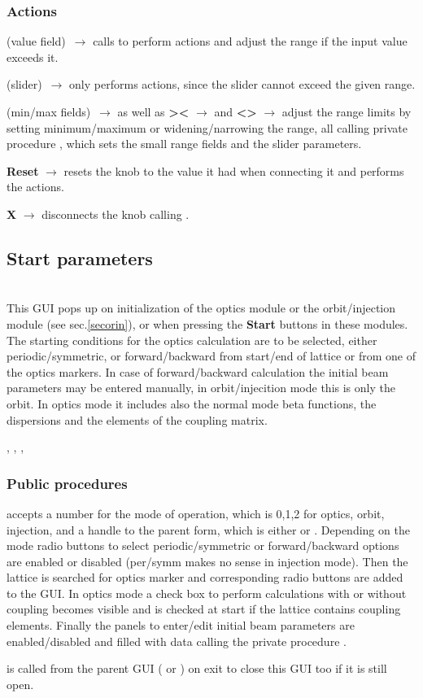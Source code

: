 \documentclass[12pt]{article}
\newcommand\code[1]{{\tt #1}}
\newcommand{\ofld}[1]{\colorbox{black!15}{{{\color{black}\bf #1}}}}
\newcommand{\ofldx}[1]{\colorbox{black!15}{{\color{black}(#1)}}}
\newcommand\guico[1]{{\color{blue}\code{#1}}}
\newcommand\guifco[1]{{\color{violet}\code{#1}}}
\newcommand{\evcodf}[2]{\ofld{#1} $\rightarrow$ \guifco{#2}}
\newcommand{\evcodxf}[2]{\ofldx{#1}~$\rightarrow$ \guifco{#2}}
\newcommand{\opagui}[1]{\colorbox{blue!20}{{\color{black}\code{#1}}}}
\newcommand{\oguih}[2]{\subsection{\label{#2}#1}{\Huge\opagui{#2}}\\}
\newcommand{\ogui}[1]{\hyperref[#1]{\opagui{#1}}}
\newcommand{\opauni}[1]{\colorbox{orange!30}{{\color{black}\code{#1}}}}
\newcommand{\ouni}[1]{\hyperref[#1]{\opauni{#1}}}
\newcommand{\uses}[1]{\flushleft {\bf Uses:} #1}
\newcommand{\desc}[1]{#1}
\newcommand{\act}[1]{\subsubsection*{Actions} #1}
\newcommand{\ppro}[1]{\subsubsection*{Public procedures} #1}
\begin{document}
\act{
\evcodxf{value field}{editKKeyPress} calls \guifco{KUpdate} to perform actions and adjust the range if the input value exceeds it.

\evcodxf{slider}{sliderScroll} only performs actions, since the slider cannot exceed the given range.

\evcodxf{min/max fields}{editmin/maxKeyPress} as well as \evcodf{\textgreater\textless}{butwidClick} and \evcodf{\textless\textgreater}{butnarClick} adjust the range limits by setting minimum/maximum or widening/narrowing the range, all calling private procedure \guifco{SetKrange}, which sets the small range fields and the slider parameters.

\evcodf{Reset}{butresClick} resets the knob to the value it had when connecting it and performs the actions.

\evcodf{X}{butfreeClick} disconnects the knob calling \guifco{Unload}.
}

\oguih{Start parameters}{ostartmenu} 

\desc{This GUI pops up on initialization of the optics module  \ogui{opalinop} or the orbit/injection module \ogui{opaorbit} (see sec.\ref{secorin}), or when pressing the \ofld{Start} buttons in these modules. The starting conditions for the optics calculation are to be selected, either periodic/symmetric, or forward/backward from start/end of lattice or from one of the optics markers. In case of forward/backward calculation the initial beam parameters may be entered manually, in orbit/injecition mode this is only the orbit. In optics mode it includes also the normal mode beta functions, the dispersions and the elements of the coupling matrix.}

\uses{\ouni{linoplib}, \ouni{globlib}, \ouni{mathlib}, \ouni{../com/asaux}} 

\ppro{
\guico{Load} accepts a number for the mode of operation, which is 0,1,2 for optics, orbit, injection, and a handle to the parent form, which is either \ogui{opalinop} or \ogui{opaorbit}. Depending on the mode radio buttons to select periodic/symmetric or forward/backward options are enabled or disabled (per/symm makes no sense in injection mode). Then the lattice is searched for optics marker and corresponding radio buttons are added to the GUI. In optics mode a check box to perform calculations with or without coupling becomes visible and is checked at start if the lattice contains coupling elements. Finally the panels to enter/edit initial beam parameters are enabled/disabled and filled with data calling the private procedure \guico{set\_pan\_ini}.

\guico{Exit} is called from the parent GUI (\ogui{opalinop} or \ogui{opaorbit}) on exit to close this GUI too if it is still open.
}
\end{document}
